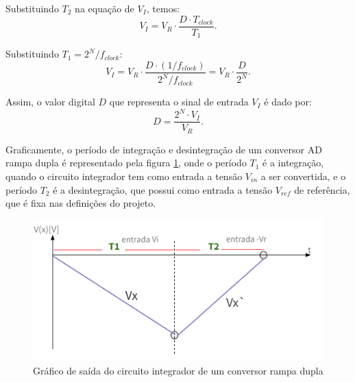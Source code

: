 Substituindo $T_2$ na equação de $V_I$, temos:
$$
    V_I = V_R \cdot \frac{D \cdot T_{clock}}{T_1}.
$$

Substituindo $T_1 = 2^N / f_{clock}$:
$$
    V_I = V_R \cdot \frac{D \cdot (1 / f_{clock})}{2^N / f_{clock}} = V_R \cdot \frac{D}{2^N}.
$$

Assim, o valor digital $D$ que representa o sinal de entrada $V_I$ é dado por:
$$
    D = \frac{2^N \cdot V_I}{V_R}.
$$

Graficamente, o período de integração e desintegração de um conversor AD rampa dupla é representado pela figura \ref{fig:dual_slope_integrator_graph}, onde o período $T_{1}$ é a integração, quando o circuito integrador tem como entrada a tensão $V_{in}$ a ser convertida, e o período $T_{2}$ é a desintegração, que possui como entrada a tensão $V_{ref}$ de referência, que é fixa nas definições do projeto.
\begin{figure}
    \centering
    \includegraphics[width=1\linewidth]{dual_slope.png}
    \caption{Gráfico de saída do circuito integrador de um conversor rampa dupla}
    \label{fig:dual_slope_integrator_graph}
\end{figure}